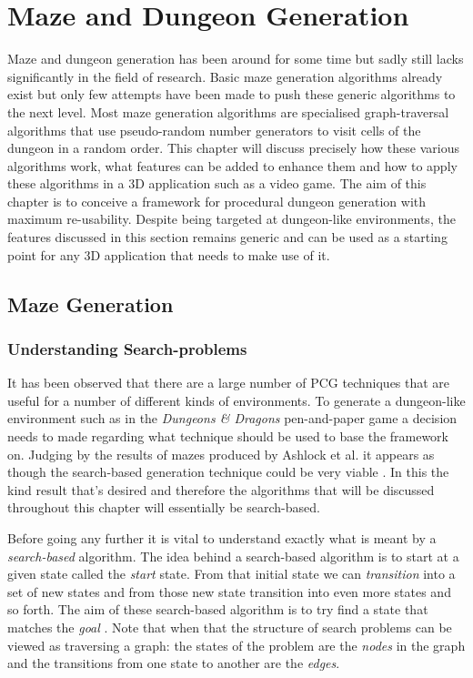 \chapter{Maze and Dungeon Generation}
Maze and dungeon generation has been around for some time but sadly still lacks significantly in the field of research. Basic maze generation algorithms already exist but only few attempts have been made to push these generic algorithms to the next level. Most maze generation algorithms are specialised graph-traversal algorithms that use pseudo-random number generators to visit cells of the dungeon in a random order. This chapter will discuss precisely how these various algorithms work, what features can be added to enhance them and how to apply these algorithms in a 3D application such as a video game. The aim of this chapter is to conceive a framework for procedural dungeon generation with maximum re-usability. Despite being targeted at dungeon-like environments, the features discussed in this section remains generic and can be used as a starting point for any 3D application that needs to make use of it.

\section{Maze Generation}
\subsection{Understanding Search-problems}
It has been observed that there are a large number of PCG techniques that are useful for a number of different kinds of environments. To generate a dungeon-like environment such as in the {\em Dungeons \& Dragons} pen-and-paper game a decision needs to made regarding what technique should be used to base the framework on. Judging by the results of mazes produced by Ashlock et al. it appears as though the search-based generation technique could be very viable \citep{DBLP:journals/tciaig/AshlockLM11}. In this the kind result that's desired and therefore the algorithms that will be discussed throughout this chapter will essentially be search-based.

Before going any further it is vital to understand exactly what is meant by a {\em search-based} algorithm. The idea behind a search-based algorithm is to start at a given state called the {\em start} state. From that initial state we can {\em transition} into a set of new  states and from those new state transition into even more states and so forth. The aim of these search-based algorithm is to try find a state that matches the {\em goal} \citep{DBLP:conf/cig/TogeliusPBWHY10}. Note that when that the structure of search problems can be viewed as traversing a graph: the states of the problem are the {\em nodes} in the graph and the transitions from one state to another are the {\em edges}.

